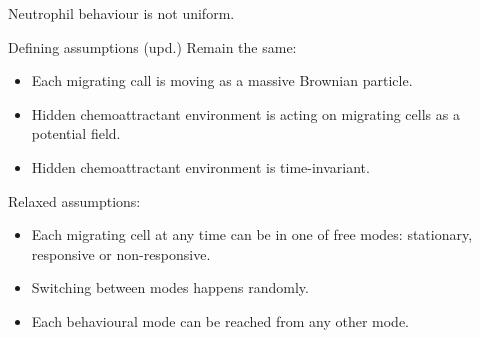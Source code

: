 \documentclass[mathserif,11pt]{beamer}
\begin{document}
\begin{frame}
\begin{columns}
\begin{column}{0.5\textwidth}
		\vspace{0.29cm}
	\end{column}
\end{columns}
Neutrophil behaviour is not uniform.\\
\vspace{0.2cm}
\vspace{0.2cm}
\end{frame}
\begin{frame}{Defining assumptions (upd.)}
Remain the same:
\begin{itemize}
	\item Each migrating call is moving as a massive Brownian particle.
	\item Hidden chemoattractant environment is acting on migrating cells as a potential field.
	\item Hidden chemoattractant environment is time-invariant.
\end{itemize}
\vspace{0.3cm}
Relaxed assumptions:
\begin{itemize}
	\item Each migrating cell at any time can be in one of free modes: stationary, responsive or non-responsive.
	\item Switching between modes happens randomly.
	\item Each behavioural mode can be reached from any other mode.
\end{itemize}
\end{frame}
\end{document}
